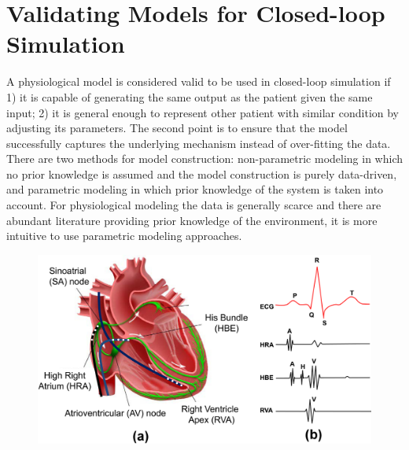 \section{Validating Models for Closed-loop Simulation}
A physiological model is considered valid to be used in closed-loop simulation if 1) it is capable of generating the same output as the patient given the same input; 2) it is general enough to represent other patient with similar condition by adjusting its parameters. The second point is to ensure that the model successfully captures the underlying mechanism instead of over-fitting the data. There are two methods for model construction: non-parametric modeling in which no prior knowledge is assumed and the model construction is purely data-driven, and parametric modeling in which prior knowledge of the system is taken into account. For physiological modeling the data is generally scarce and there are abundant literature providing prior knowledge of the environment, it is more intuitive to use parametric modeling approaches.

\begin{figure}[!t]
\centering
		\includegraphics[width=0.9  \textwidth]{figs/probes.png}
		
\caption{\small }
\label{fig:egm}
\end{figure} 

